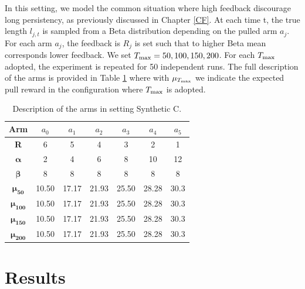 In this setting, we model the common situation where high feedback discourage long persistency, as previously discussed in Chapter \ref{CF}. At each time t, the true length $l_{j,t}$ is sampled from a Beta distribution depending on the pulled arm $a_j$. For each arm $a_j$, the feedback is $R_j$ is set such that to higher Beta mean corresponds lower feedback. We set $T_{\textnormal{max}}=50,100,150,200$. For each $T_{\textnormal{max}}$ adopted, the experiment is repeated for 50 independent runs. The full description of the arms is provided in Table \ref{tabSC} where with $\mu_{T_{\textnormal{max}}}$ we indicate the expected pull reward in the configuration where $T_{\textnormal{max}}$ is adopted.



\begin{table}[H]
	\centering
	\caption{Description of the arms in setting Synthetic C.}
	
	\begin{tabular}{|c|cccccc|}
		\hline
		\textbf{Arm}          & $a_0$ & $a_1$ & $a_2$ & $a_3$ & $a_4$ & $a_5$ \\ \hline
		\textbf{R}            & 6     & 5     & 4     & 3     & 2     & 1     \\
		$\boldsymbol{\alpha}$ & 2     & 4     & 6     & 8     & 10    & 12    \\
		$\boldsymbol{\beta}$  & 8     & 8     & 8     & 8     & 8     & 8     \\
		$\boldsymbol{\mu_{50}}$    & 10.50 & 17.17 & 21.93 & 25.50 & 28.28 & 30.3  \\ 
		$\boldsymbol{\mu_{100}}$    & 10.50 & 17.17 & 21.93 & 25.50 & 28.28 & 30.3  \\ 
		$\boldsymbol{\mu_{150}}$    & 10.50 & 17.17 & 21.93 & 25.50 & 28.28 & 30.3  \\ 
		$\boldsymbol{\mu_{200}}$    & 10.50 & 17.17 & 21.93 & 25.50 & 28.28 & 30.3  \\ \hline
	\end{tabular}
	
	\label{tabSC}
\end{table}

\section{Results}


